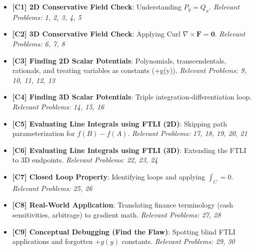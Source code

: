 \documentclass[12pt]{article}
\begin{document}
\begin{itemize}[label=$\square$]
    \item \textbf{[C1] 2D Conservative Field Check}: Understanding $P_y = Q_x$. \newline \textit{Relevant Problems: 1, 2, 3, 4, 5}
    \item \textbf{[C2] 3D Conservative Field Check}: Applying Curl $\nabla \times \mathbf{F} = \mathbf{0}$. \newline \textit{Relevant Problems: 6, 7, 8}
    \item \textbf{[C3] Finding 2D Scalar Potentials}: Polynomials, transcendentals, rationals, and treating variables as constants (+g(y)). \newline \textit{Relevant Problems: 9, 10, 11, 12, 13}
    \item \textbf{[C4] Finding 3D Scalar Potentials}: Triple integration-differentiation loop. \newline \textit{Relevant Problems: 14, 15, 16}
    \item \textbf{[C5] Evaluating Line Integrals using FTLI (2D)}: Skipping path parameterization for $f(B) - f(A)$. \newline \textit{Relevant Problems: 17, 18, 19, 20, 21}
    \item \textbf{[C6] Evaluating Line Integrals using FTLI (3D)}: Extending the FTLI to 3D endpoints. \newline \textit{Relevant Problems: 22, 23, 24}
    \item \textbf{[C7] Closed Loop Property}: Identifying loops and applying $\int_C = 0$. \newline \textit{Relevant Problems: 25, 26}
    \item \textbf{[C8] Real-World Application}: Translating finance terminology (cash sensitivities, arbitrage) to gradient math. \newline \textit{Relevant Problems: 27, 28}
    \item \textbf{[C9] Conceptual Debugging (Find the Flaw)}: Spotting blind FTLI applications and forgotten $+g(y)$ constants. \newline \textit{Relevant Problems: 29, 30}
\end{itemize}
\end{document}
